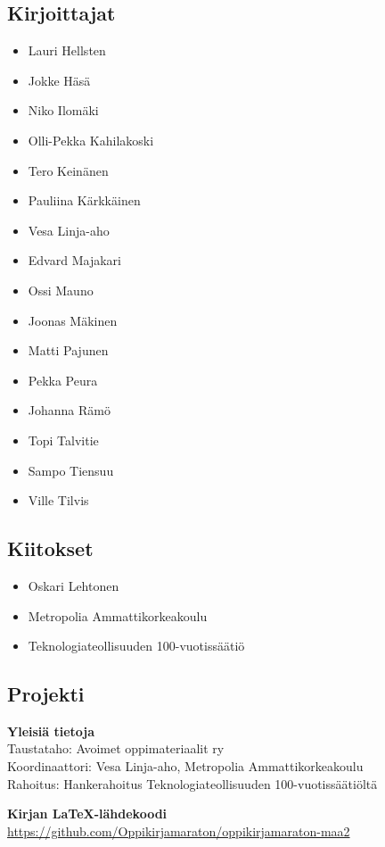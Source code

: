 \subsection*{Kirjoittajat}
\begin{itemize}
\item Lauri Hellsten
\item Jokke Häsä
\item Niko Ilomäki
\item Olli-Pekka Kahilakoski
\item Tero Keinänen
\item Pauliina Kärkkäinen
\item Vesa Linja-aho
\item Edvard Majakari
\item Ossi Mauno
\item Joonas Mäkinen
\item Matti Pajunen
\item Pekka Peura
\item Johanna Rämö
\item Topi Talvitie
\item Sampo Tiensuu
\item Ville Tilvis
\end{itemize}

\subsection*{Kiitokset}
\begin{itemize}
\item Oskari Lehtonen %
\item Metropolia Ammattikorkeakoulu %
\item Teknologiateollisuuden 100-vuotissäätiö %
\end{itemize}



\newpage
\subsection*{Projekti}

\textbf{Yleisiä tietoja} \\
Taustataho: Avoimet oppimateriaalit ry \\
Koordinaattori: Vesa Linja-aho, Metropolia Ammattikorkeakoulu \\
Rahoitus: Hankerahoitus Teknologiateollisuuden 100-vuotissäätiöltä

\textbf{Kirjan LaTeX-lähdekoodi} \\
\url{https://github.com/Oppikirjamaraton/oppikirjamaraton-maa2}

